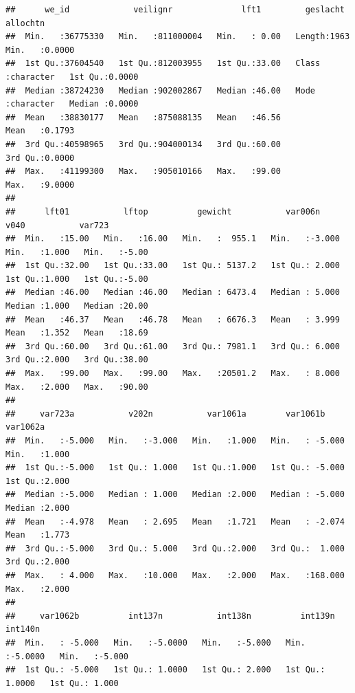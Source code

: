 \documentclass[
]{book}
\begin{document}
\begin{verbatim}
##      we_id             veilignr              lft1         geslacht            allochtn     
##  Min.   :36775330   Min.   :811000004   Min.   : 0.00   Length:1963        Min.   :0.0000  
##  1st Qu.:37604540   1st Qu.:812003955   1st Qu.:33.00   Class :character   1st Qu.:0.0000  
##  Median :38724230   Median :902002867   Median :46.00   Mode  :character   Median :0.0000  
##  Mean   :38830177   Mean   :875088135   Mean   :46.56                      Mean   :0.1793  
##  3rd Qu.:40598965   3rd Qu.:904000134   3rd Qu.:60.00                      3rd Qu.:0.0000  
##  Max.   :41199300   Max.   :905010166   Max.   :99.00                      Max.   :9.0000  
##                                                                                            
##      lft01           lftop          gewicht           var006n            v040           var723     
##  Min.   :15.00   Min.   :16.00   Min.   :  955.1   Min.   :-3.000   Min.   :1.000   Min.   :-5.00  
##  1st Qu.:32.00   1st Qu.:33.00   1st Qu.: 5137.2   1st Qu.: 2.000   1st Qu.:1.000   1st Qu.:-5.00  
##  Median :46.00   Median :46.00   Median : 6473.4   Median : 5.000   Median :1.000   Median :20.00  
##  Mean   :46.37   Mean   :46.78   Mean   : 6676.3   Mean   : 3.999   Mean   :1.352   Mean   :18.69  
##  3rd Qu.:60.00   3rd Qu.:61.00   3rd Qu.: 7981.1   3rd Qu.: 6.000   3rd Qu.:2.000   3rd Qu.:38.00  
##  Max.   :99.00   Max.   :99.00   Max.   :20501.2   Max.   : 8.000   Max.   :2.000   Max.   :90.00  
##                                                                                                    
##     var723a           v202n           var1061a        var1061b          var1062a    
##  Min.   :-5.000   Min.   :-3.000   Min.   :1.000   Min.   : -5.000   Min.   :1.000  
##  1st Qu.:-5.000   1st Qu.: 1.000   1st Qu.:1.000   1st Qu.: -5.000   1st Qu.:2.000  
##  Median :-5.000   Median : 1.000   Median :2.000   Median : -5.000   Median :2.000  
##  Mean   :-4.978   Mean   : 2.695   Mean   :1.721   Mean   : -2.074   Mean   :1.773  
##  3rd Qu.:-5.000   3rd Qu.: 5.000   3rd Qu.:2.000   3rd Qu.:  1.000   3rd Qu.:2.000  
##  Max.   : 4.000   Max.   :10.000   Max.   :2.000   Max.   :168.000   Max.   :2.000  
##                                                                                     
##     var1062b          int137n           int138n          int139n           int140n      
##  Min.   : -5.000   Min.   :-5.0000   Min.   :-5.000   Min.   :-5.0000   Min.   :-5.000  
##  1st Qu.: -5.000   1st Qu.: 1.0000   1st Qu.: 2.000   1st Qu.: 1.0000   1st Qu.: 1.000  

\end{verbatim}
\end{document}
